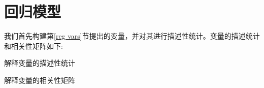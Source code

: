 \section{回归模型}
我们首先构建第\ref{reg vars}节提出的变量，并对其进行描述性统计。变量的描述统计和相关性矩阵如下:
\newpage
{}
\begin{landscape}
    \tiny
\begin{table}[H]
    
    \caption{解释变量的描述性统计}
    
\end{table}
\begin{table}[H]
    
    \caption{解释变量的相关性矩阵}
        
\end{table}
\end{landscape}


